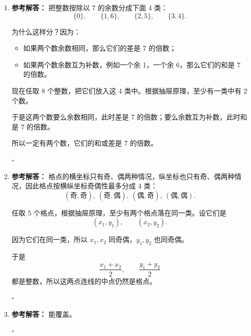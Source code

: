 \documentclass[11pt,a4paper,fontset=fandol]{ctexart}
\newenvironment{solution}{\par\noindent\textbf{参考解答：}}{\hfill$\square$\par}
\begin{document}
\begin{enumerate}
\begin{solution}
  这 4 本书排好后形成 5 个空位：
  \[
  \square B \square B \square B \square B \square
  \]
  要使数学、语文、英语三本书互不相邻，就必须从这 5 个空位中选 3 个空位给它们放入，有
  \[
  \binom{5}{3}
  \]
  种。

  这三本书彼此不同，所以还可以在 3 个空位中排列，有
  \[
  3!
  \]
  种。

  总排法为
  \[
  4!\binom{5}{3}3!=24\times 10\times 6=1440.
  \]

  \end{solution}

  \item \begin{solution}
  把整数按除以 7 的余数分成下面 4 类：
  \[
  \{0\},\qquad \{1,6\},\qquad \{2,5\},\qquad \{3,4\}.
  \]

  为什么这样分？因为：
  \begin{itemize}
    \item 如果两个数余数相同，那么它们的差是 7 的倍数；
    \item 如果两个数余数互为补数，例如一个余 1，一个余 6，那么它们的和是 7 的倍数。
  \end{itemize}

  现在任取 8 个整数，把它们放入这 4 类中。根据抽屉原理，至少有一类中有 2 个数。

  于是这两个数要么余数相同，此时差是 7 的倍数；要么余数互为补数，此时和是 7 的倍数。

  所以一定有两个数，它们的和或差是 7 的倍数。

  \end{solution}

  \item \begin{solution}
  格点的横坐标只有奇、偶两种情况，纵坐标也只有奇、偶两种情况，因此格点按横纵坐标奇偶性最多分成 4 类：
  \[
  (\text{奇},\text{奇}),\ (\text{奇},\text{偶}),\ (\text{偶},\text{奇}),\ (\text{偶},\text{偶}).
  \]

  任取 5 个格点，根据抽屉原理，至少有两个格点落在同一类。设它们是
  \[
  (x_1,y_1),\qquad (x_2,y_2).
  \]

  因为它们在同一类，所以 $x_1,x_2$ 同奇偶，$y_1,y_2$ 也同奇偶。

  于是
  \[
  \frac{x_1+x_2}{2},\qquad \frac{y_1+y_2}{2}
  \]
  都是整数，所以这两点连线的中点仍然是格点。

  \end{solution}

  \item \begin{solution}
  能覆盖。


\end{solution}
\end{enumerate}
\end{document}
